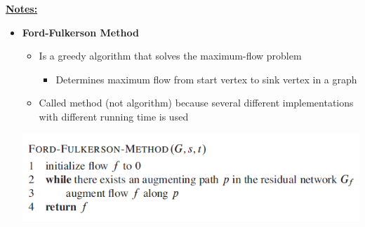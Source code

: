 \documentclass[12pt]{article}
\begin{document}
\begin{enumerate}[1.]








    \underline{\textbf{Notes:}}

    \bigskip

    \begin{itemize}
        \item \textbf{Ford-Fulkerson Method}

        \begin{itemize}
            \item Is a greedy algorithm that solves the maximum-flow problem
            \begin{itemize}
                \item Determines maximum flow from start vertex to sink vertex in a graph
            \end{itemize}
            \item Called method (not algorithm) because several different implementations
            with different running time is used
        \end{itemize}

        \begin{center}
        \includegraphics[width=0.9\linewidth]{images/worksheet_5_solution_9.png}
        \end{center}


\end{itemize}
\end{enumerate}
\end{document}
